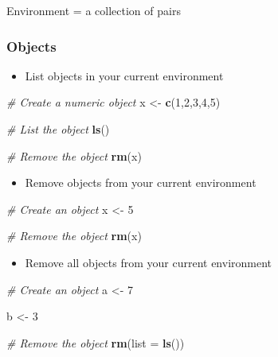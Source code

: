 \documentclass[
]{book}
\newenvironment{Shaded}{\begin{snugshade}}{\end{snugshade}}
\newcommand{\AttributeTok}[1]{\textcolor[rgb]{0.13,0.29,0.53}{#1}}
\newcommand{\CommentTok}[1]{\textcolor[rgb]{0.56,0.35,0.01}{\textit{#1}}}
\newcommand{\DecValTok}[1]{\textcolor[rgb]{0.00,0.00,0.81}{#1}}
\newcommand{\FunctionTok}[1]{\textcolor[rgb]{0.13,0.29,0.53}{\textbf{#1}}}
\newcommand{\NormalTok}[1]{#1}
\newcommand{\OtherTok}[1]{\textcolor[rgb]{0.56,0.35,0.01}{#1}}
\providecommand{\tightlist}{%
  \setlength{\itemsep}{0pt}\setlength{\parskip}{0pt}}
\begin{document}
Environment = a collection of pairs

\subsubsection{Objects}\label{objects}

\begin{itemize}
\tightlist
\item
  List objects in your current environment
\end{itemize}

\begin{Shaded}
\begin{Highlighting}[]
\CommentTok{\# Create a numeric object}
\NormalTok{x }\OtherTok{\textless{}{-}} \FunctionTok{c}\NormalTok{(}\DecValTok{1}\NormalTok{,}\DecValTok{2}\NormalTok{,}\DecValTok{3}\NormalTok{,}\DecValTok{4}\NormalTok{,}\DecValTok{5}\NormalTok{)}

\CommentTok{\# List the object}
\FunctionTok{ls}\NormalTok{()}

\CommentTok{\# Remove the object}
\FunctionTok{rm}\NormalTok{(x)}
\end{Highlighting}
\end{Shaded}

\begin{itemize}
\tightlist
\item
  Remove objects from your current environment
\end{itemize}

\begin{Shaded}
\begin{Highlighting}[]
\CommentTok{\# Create an object}
\NormalTok{x }\OtherTok{\textless{}{-}} \DecValTok{5}

\CommentTok{\# Remove the object}
\FunctionTok{rm}\NormalTok{(x)}
\end{Highlighting}
\end{Shaded}

\begin{itemize}
\tightlist
\item
  Remove all objects from your current environment
\end{itemize}

\begin{Shaded}
\begin{Highlighting}[]
\CommentTok{\# Create an object}
\NormalTok{a }\OtherTok{\textless{}{-}} \DecValTok{7}

\NormalTok{b }\OtherTok{\textless{}{-}} \DecValTok{3}

\CommentTok{\# Remove the object}
\FunctionTok{rm}\NormalTok{(}\AttributeTok{list =} \FunctionTok{ls}\NormalTok{())}
\end{Highlighting}
\end{Shaded}
\end{document}
